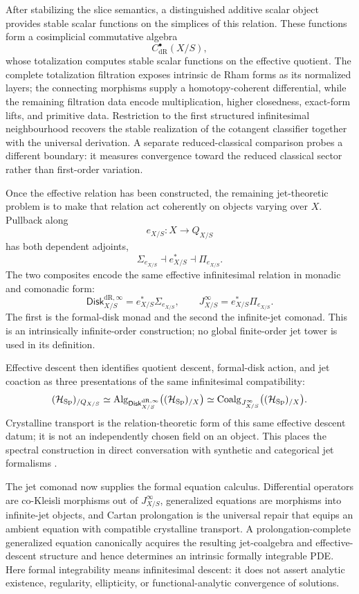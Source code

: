 After stabilizing the slice semantics, a distinguished additive scalar object
provides stable scalar functions on the simplices of this relation.  These
functions form a cosimplicial commutative algebra
\[
    C^\bullet_{\mathrm{dR}}(X/S),
\]
whose totalization computes stable scalar functions on the effective quotient.
The complete totalization filtration exposes intrinsic de Rham forms as its
normalized layers; the connecting morphisms supply a homotopy-coherent
differential, while the remaining filtration data encode multiplication,
higher closedness, exact-form lifts, and primitive data.  Restriction to the
first structured infinitesimal neighbourhood recovers the stable realization of
the cotangent classifier together with the universal derivation.  A separate
reduced-classical comparison probes a different boundary: it measures
convergence toward the reduced classical sector rather than first-order
variation.

Once the effective relation has been constructed, the remaining jet-theoretic
problem is to make that relation act coherently on objects varying over
\(X\).  Pullback along
\[
    e_{X/S}:X\longrightarrow Q_{X/S}
\]
has both dependent adjoints,
\[
    \Sigma_{e_{X/S}}
    \dashv
    e_{X/S}^*
    \dashv
    \Pi_{e_{X/S}}.
\]
The two composites encode the same effective infinitesimal relation in
monadic and comonadic form:
\[
    \mathsf{Disk}^{\mathrm{dR},\infty}_{X/S}
    =
    e_{X/S}^*\Sigma_{e_{X/S}},
    \qquad
    J^\infty_{X/S}
    =
    e_{X/S}^*\Pi_{e_{X/S}}.
\]
The first is the formal-disk monad and the second the infinite-jet comonad.
This is an intrinsically infinite-order construction; no global finite-order
jet tower is used in its definition.

Effective descent then identifies quotient descent, formal-disk action, and
jet coaction as three presentations of the same infinitesimal compatibility:
\[
    (\mathcal H_{\operatorname{Sp}})_{/Q_{X/S}}
    \simeq
    \operatorname{Alg}_{\mathsf{Disk}^{\mathrm{dR},\infty}_{X/S}}
    \bigl((\mathcal H_{\operatorname{Sp}})_{/X}\bigr)
    \simeq
    \operatorname{Coalg}_{J^\infty_{X/S}}
    \bigl((\mathcal H_{\operatorname{Sp}})_{/X}\bigr).
\]
Crystalline transport is the relation-theoretic form of this same effective
descent datum; it is not an independently chosen field on an object.  This
places the spectral construction in direct conversation with synthetic and
categorical jet formalisms
\cite{Kock1980,Marvan1986,KhavkineSchreiber2017,GiotopoulosKhavkineSatiSchreiber2026}.

The jet comonad now supplies the formal equation calculus.  Differential
operators are co-Kleisli morphisms out of \(J^\infty_{X/S}\), generalized
equations are morphisms into infinite-jet objects, and Cartan prolongation is
the universal repair that equips an ambient equation with compatible
crystalline transport.  A prolongation-complete generalized equation
canonically acquires the resulting jet-coalgebra and effective-descent
structure and hence determines an intrinsic formally integrable PDE.
Here formal integrability means infinitesimal descent: it does not assert
analytic existence, regularity, ellipticity, or functional-analytic
convergence of solutions.

